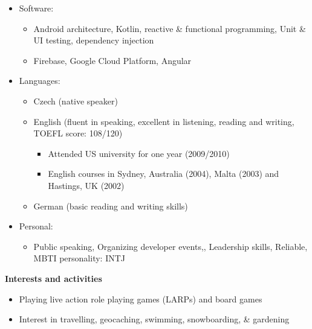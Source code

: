 \documentclass[letterpaper,11pt]{article}
\newcommand{\resitem}[1]{\item #1 \vspace{-2pt}}
\newcommand{\resheading}[1]{{\large \colorbox{mygrey}{\begin{minipage}{\textwidth}{\textbf{#1 \vphantom{p\^{E}}}}\end{minipage}}}}
\begin{document}
\begin{itemize}
	 \item Software:
		 \begin{itemize}
	 		\footnotesize
			\resitem{Android architecture, Kotlin, reactive \& functional programming, Unit \& UI testing, dependency injection}
			\resitem{Firebase, Google Cloud Platform, Angular}
		 \end{itemize} 	
	\item Languages:
		\begin{itemize}
			\footnotesize
			\resitem{Czech (native speaker)}
			\resitem{English (fluent in speaking, excellent in listening, reading and writing, TOEFL score: 108/120)}
			\begin{itemize}
			\resitem{Attended US university for one year (2009/2010)}
			\resitem{English courses in Sydney, Australia (2004), Malta (2003) and Hastings, UK (2002)}
			\end{itemize}
			\resitem{German (basic reading and writing skills) }
		\end{itemize}	
	\item Personal:
		\begin{itemize}
			\footnotesize
			\resitem{Public speaking, Organizing developer events,, Leadership skills,  Reliable, MBTI personality: INTJ}
		\end{itemize}			
\end{itemize}

\resheading{Interests and activities}
\begin{itemize}
	\item Playing live action role playing games (LARPs) and board games
	\item Interest in travelling, geocaching, swimming, snowboarding, \& gardening
\end{itemize}
\end{document}
